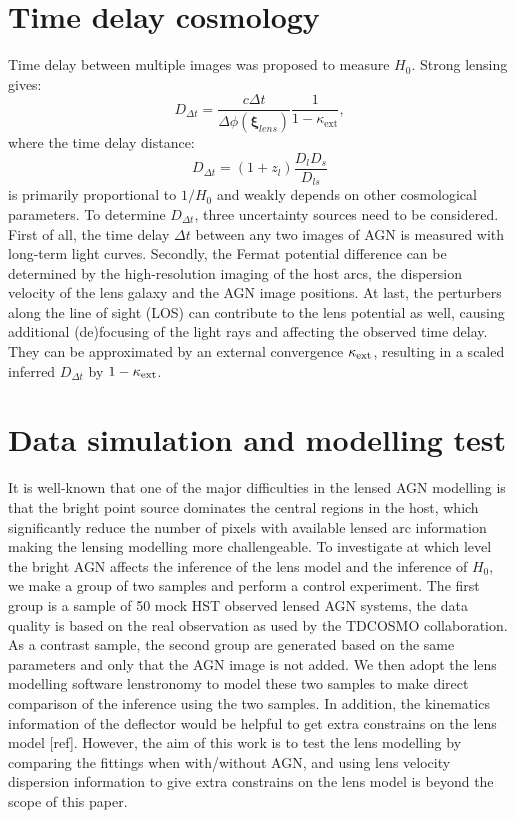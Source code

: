 \documentclass[useAMS,usenatbib,usegraphicx]{mn2e}
\newcommand{\hc}{$H_0$}
\begin{document}
\section{Time delay cosmology}
Time delay between multiple images was proposed to measure $H_0$.
Strong lensing gives: 
\begin{equation}
D_{\Delta t}=\frac{c\Delta t}{\Delta\phi(\boldsymbol{\xi}_{lens})}\frac{1}{1-\kappa_\mathrm{ext}},
\end{equation}
where the time delay distance:
\begin{equation}
D_{\Delta t}=(1+z_l)\frac{D_lD_s}{D_{ls}}
\end{equation}
is primarily proportional to $1/H_0$ and weakly depends on other cosmological parameters.
To determine $D_{\Delta t}$, three uncertainty sources need to be considered. First of all,
the time delay $\Delta t$ between any two images of AGN is measured with long-term light curves.
Secondly, the Fermat potential difference can be determined by the high-resolution imaging of the host arcs, the dispersion velocity of the lens galaxy and the AGN image positions. At last,
the perturbers along the line of sight (LOS) can contribute to the lens potential as well, causing additional (de)focusing of the light rays and affecting the observed time delay. They
can be approximated by an external convergence $\kappa_{\rm{ext}}$, resulting in a scaled inferred $D_{\Delta t}$ by $1-\kappa_{\rm{ext}}$.

\section{Data simulation and modelling test}
It is well-known that one of the major difficulties in the lensed AGN modelling is that the bright point source dominates the central regions in the host, which significantly reduce the number of pixels with available lensed arc information making the lensing modelling more challengeable.  
To investigate at which level the bright AGN affects the inference of the lens model and the inference of \hc, we make a group of two samples and perform a control experiment. The first group is a sample of 50 mock HST observed lensed AGN systems, the data quality is based on the real observation as used by the TDCOSMO collaboration. As a contrast sample, the second group are generated based on the same parameters and only that the AGN image is not added. We then adopt the lens modelling software lenstronomy to model these two samples to make direct comparison of the inference using the two samples. In addition, the kinematics information of the deflector would be helpful to get extra constrains on the lens model [ref]. However, the aim of this work is to test the lens modelling by comparing the fittings when with/without AGN, and using lens velocity dispersion information to give extra constrains on the lens model is beyond the scope of this paper. 
\end{document}
